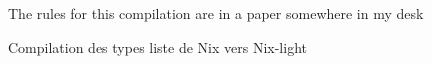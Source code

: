 \begin{figure}
  \center
  The rules for this compilation are in a paper somewhere in my desk
  \caption{Compilation des types liste de Nix vers Nix-light}\label{typage::listes::compilation}
\end{figure}
